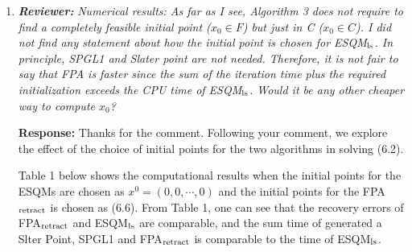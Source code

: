 \documentclass{article}
\begin{document}
\begin{enumerate}
	\item  \textit{\textbf{Reviewer:}} \textit{Numerical results: As far as I see, Algorithm 3 does not require to find a completely feasible initial point ($x_0\in F$) but just in C ($x_0\in C$). I did not find any statement about how the initial point is chosen for ESQM$_{\rm ls}$. In principle, SPGL1 and Slater point are not needed. Therefore, it is not fair to say that FPA is faster since the sum of the iteration time plus the required initialization exceeds the CPU time of ESQM$_{\rm ls}$. Would it be any other cheaper way to compute $x_0$?}
	
	\textbf{Response:} Thanks for the comment. Following your comment, we explore the effect of the choice of initial points for the two algorithms in solving (6.2).

Table 1 below shows the computational results when the initial points for the ESQMs are chosen as
$x^0 = (0, 0, \cdots, 0)$ and the initial points for the FPA$_{\rm retract}$ is chosen as (6.6). From Table 1, one can see that 
the recovery errors of FPA$_{\rm retract}$ and ESQM$_{\rm ls}$ are comparable, and the sum time of generated a Slter Point, SPGL1 and FPA$_{\rm retract}$ is comparable to the time of ESQM$_{\rm ls}$.
                                                                  




\end{enumerate}
\end{document}
